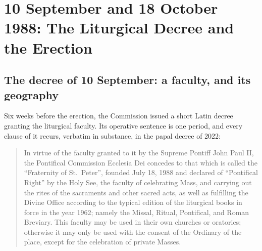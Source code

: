 \section{10 September and 18 October 1988: The Liturgical Decree and the Erection}

\subsection{The decree of 10 September: a faculty, and its geography}

Six weeks before the erection, the Commission issued a short Latin decree
granting the liturgical faculty. Its operative sentence is one period,
and every clause of it recurs, verbatim in substance, in the papal decree
of 2022:

\begin{quote}\small
In virtue of the faculty granted to it by the Supreme Pontiff John Paul
II, the Pontifical Commission Ecclesia Dei concedes to that which is
called the ``Fraternity of St.\ Peter'', founded July 18, 1988 and
declared of ``Pontifical Right'' by the Holy See, the faculty of
celebrating Mass, and carrying out the rites of the sacraments and other
sacred acts, as well as fulfilling the Divine Office according to the
typical edition of the liturgical books in force in the year 1962; namely
the Missal, Ritual, Pontifical, and Roman Breviary. This faculty may be
used in their own churches or oratories; otherwise it may only be used
with the consent of the Ordinary of the place, except for the celebration
of private Masses.
\end{quote}

